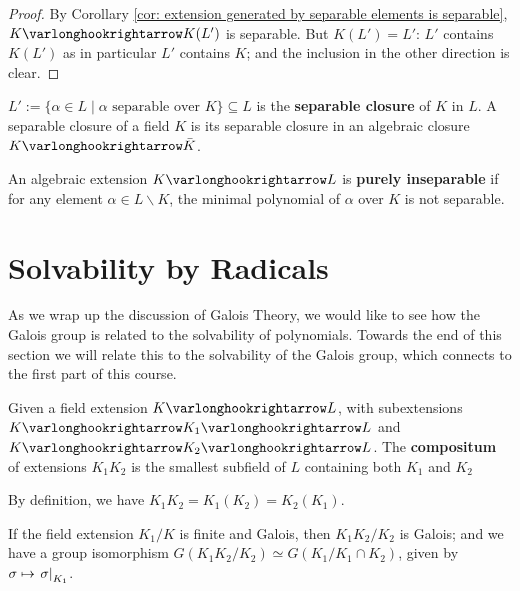 \begin{proof}
    By Corollary \ref{cor: extension generated by separable elements is separable}, $K \ext K(L')$ is separable. But $K(L') = L'$: $L'$ contains $K(L')$ as in particular $L'$ contains $K$; and the inclusion in the other direction is clear.
\end{proof}

\begin{definition}
    $L' := \{ \alpha \in L \mid \alpha \text{ separable over $K$}\} \subseteq L$ is the \textbf{separable closure} of $K$ in $L$. A separable closure of a field $K$ is its separable closure in an algebraic closure $K \ext \bar{K}$.
\end{definition}
\nogap
\begin{definition}
    An algebraic extension $K \ext L$ is \textbf{purely inseparable} if for any element $\alpha \in L \smallsetminus K$, the minimal polynomial of $\alpha$ over $K$ is not separable. 
\end{definition}

\section{Solvability by Radicals}

\textstart
As we wrap up the discussion of Galois Theory, we would like to see how the Galois group is related to the solvability of polynomials. Towards the end of this section we will relate this to the solvability of the Galois group, which connects to the first part of this course.

\begin{definition}[Compositum]
    Given a field extension $K \ext L$, with subextensions $K \ext K_1 \ext L$ and $K \ext K_2 \ext L$. The \textbf{compositum} of extensions $K_1K_2$ is the smallest subfield of $L$ containing both $K_1$ and $K_2$
\end{definition}

\begin{remark}
    By definition, we have $K_1 K_2 = K_1(K_2) = K_2(K_1)$.
\end{remark}

\begin{proposition}
    If the field extension $K_1/K$ is finite and Galois, then $K_1 K_2/K_2$ is Galois; and we have a group isomorphism $G(K_1K_2/K_2) \simeq G(K_1/K_1\cap K_2)$, given by $\sigma \mapsto \left.\sigma\right|_{K_1}$.
\end{proposition}

